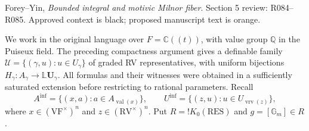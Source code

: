 \documentclass[12pt]{amsart}
\theoremstyle{remark}
\theoremstyle{definition}
\newcommand{\C}{\mathds{C}}
\newcommand{\Q}{\mathds{Q}}
\newcommand{\RV}{\mathrm{RV}}
\newcommand{\RES}{\mathrm{RES}}
\newcommand{\VF}{\mathrm{VF}}
\newcommand{\vrv}{\operatorname{vrv}}
\numberwithin{equation}{section}
\newcommand{\Gm}{\mathbb G_m}
\newcommand{\Bangres}{{!K_0(\RES)}}
\newcommand{\vv}{\operatorname{val}}
\theoremstyle{plain}
\begin{document}
\setcounter{section}{5}
\setcounter{subsection}{1}
\setcounter{equation}{1}
{\small\noindent Forey--Yin, \emph{Bounded integral and motivic Milnor fiber}.
Section 5 review: R084--R085.
Approved context is black; proposed manuscript text is orange.}
\medskip

\noindent We work in the original language over
$F=\C((t))$, with value group $\Q$ in the Puiseux field.
The preceding compactness argument gives a definable family
$\mathcal U=\{(\gamma,u):u\in U_\gamma\}$ of graded RV
representatives, with uniform bijections
$H_\gamma:A_\gamma\to\mathbb L\bm U_\gamma$.
All formulas and their witnesses were obtained in a sufficiently
saturated extension before restricting to rational parameters.
Recall
\[
 A^{\mathrm{inf}}
 =\{(x,a):a\in A_{\vv(x)}\},\qquad
 U^{\mathrm{inf}}
 =\{(z,u):u\in U_{\vrv(z)}\},
\]
where $x\in(\VF^\times)^n$ and $z\in(\RV^\times)^n$.
Put $R=\Bangres$ and $g=[\Gm]\in R$.
\end{document}
